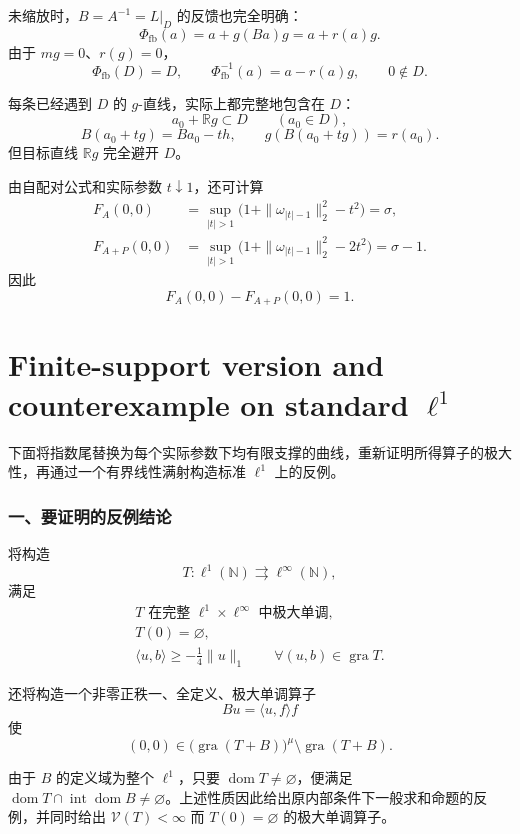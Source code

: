 \documentclass[UTF8,fontset=fandol,11pt,a4paper]{ctexart}
\begin{document}
未缩放时，$B=A^{-1}=L|_D$ 的反馈也完全明确： \[
\Phi_{\mathrm{fb}}(a)=a+g(Ba)g=a+r(a)g.
\] 由于 $mg=0$、$r(g)=0$， \[
\boxed{\Phi_{\mathrm{fb}}(D)=D,\qquad \Phi_{\mathrm{fb}}^{-1}(a)=a-r(a)g,\qquad0\notin D.}
\tag{32}
\]

每条已经遇到 $D$ 的 $g$-直线，实际上都完整地包含在 $D$： \[
a_0+\mathbb Rg\subset D\qquad(a_0\in D),
\] \[
B(a_0+tg)=Ba_0-th,\qquad
g(B(a_0+tg))=r(a_0).
\tag{33}
\] 但目标直线 $\mathbb Rg$ 完全避开 $D$。

由自配对公式和实际参数 $t\downarrow1$，还可计算
\[
\begin{aligned}
F_A(0,0)
&=\sup_{|t|>1}\bigl(1+\|\omega_{|t|-1}\|_2^2-t^2\bigr)=\sigma,\\
F_{A+P}(0,0)
&=\sup_{|t|>1}\bigl(1+\|\omega_{|t|-1}\|_2^2-2t^2\bigr)=\sigma-1.
\end{aligned}
\]
因此
\[
F_A(0,0)-F_{A+P}(0,0)=1.
\]

\clearpage
\part*{Finite-support version and counterexample on standard $\ell^1$}

下面将指数尾替换为每个实际参数下均有限支撑的曲线，重新证明所得算子的极大性，再通过一个有界线性满射构造标准 $\ell^1$ 上的反例。

\section{一、要证明的反例结论}\label{ux4e00ux8981ux8bc1ux660eux7684ux53cdux4f8bux7ed3ux8bba}

将构造 \[
T:\ell^1(\mathbb N)\rightrightarrows\ell^\infty(\mathbb N),
\] 满足 \[
\boxed{
\begin{gathered}
T\text{ 在完整 }\ell^1\times\ell^\infty\text{ 中极大单调},\\
T(0)=\varnothing,\\
\langle u,b\rangle\ge-\frac14\|u\|_1
\qquad\forall(u,b)\in\operatorname{gra}T.
\end{gathered}}
\]

还将构造一个非零正秩一、全定义、极大单调算子 \[
Bu=\langle u,f\rangle f
\] 使 \[
\boxed{
(0,0)\in
\bigl(\operatorname{gra}(T+B)\bigr)^\mu
\setminus\operatorname{gra}(T+B).
}
\]

由于 $B$ 的定义域为整个 $\ell^1$，只要 $\operatorname{dom}T\ne\varnothing$，便满足 $\operatorname{dom}T\cap\operatorname{int}\operatorname{dom}B\ne\varnothing$。上述性质因此给出原内部条件下一般求和命题的反例，并同时给出 $\mathcal V(T)<\infty$ 而 $T(0)=\varnothing$ 的极大单调算子。
\end{document}
